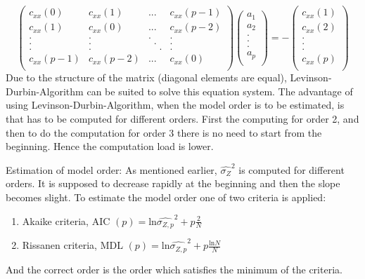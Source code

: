 \begin{equation*}
\begin{pmatrix}
c_{xx}(0) & c_{xx}(1) & ... & c_{xx}(p-1)\\
c_{xx}(1) & c_{xx}(0) & ... & c_{xx}(p-2)\\
. & . &.  &. \\
. & . &\;\;.  &. \\
. & . &\; \; \; \; .  &. \\
c_{xx}(p-1) & c_{xx}(p-2) & ... & c_{xx}(0)\\
\end{pmatrix}
\begin{pmatrix}
a_1\\
a_2\\
. \\
. \\
. \\
a_p \\
\end{pmatrix} = -
\begin{pmatrix}
c_{xx}(1)\\
c_{xx}(2)\\
. \\
. \\
. \\
c_{xx}(p)\\
\end{pmatrix}
\end{equation*}
\noindent Due to the structure of the matrix (diagonal elements are equal), Levinson-Durbin-Algorithm can be suited to solve this equation system. The advantage of using Levinson-Durbin-Algorithm, when the model order is to be estimated, is that has to be computed for different orders. First the computing for order 2, and then to do the computation for order 3 there is no need to start from the beginning. Hence the computation load is lower.

\noindent Estimation of model order:
\noindent As mentioned earlier, $\hat{{\sigma_Z}}^2$ is computed for different orders. It is supposed to decrease rapidly at the beginning and then the slope becomes slight. To estimate the model order one of two criteria is applied:
\begin{enumerate}
 \item Akaike criteria, AIC $(p) = \text{ln} \hat{{\sigma_{Z,p}}}^2 + p \frac{2}{N}$
 \item Rissanen criteria, MDL $(p) = \text{ln} \hat{{\sigma_{Z,p}}}^2 + p \frac{\text{ln}N}{N}$
  \end{enumerate}
\noindent 
And the correct order is the order which satisfies the minimum of the criteria.

